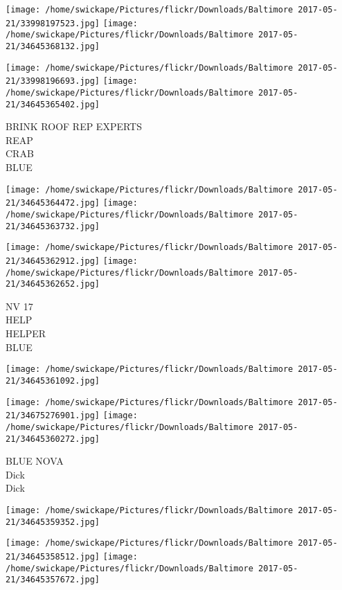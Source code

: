 \documentclass[10pt,letterpaper]{article}
\begin{document}
\texttt{[image: /home/swickape/Pictures/flickr/Downloads/Baltimore 2017-05-21/33998197523.jpg]}
\texttt{[image: /home/swickape/Pictures/flickr/Downloads/Baltimore 2017-05-21/34645368132.jpg]}

\texttt{[image: /home/swickape/Pictures/flickr/Downloads/Baltimore 2017-05-21/33998196693.jpg]}
\texttt{[image: /home/swickape/Pictures/flickr/Downloads/Baltimore 2017-05-21/34645365402.jpg]}

BRINK ROOF REP EXPERTS\\
REAP\\
CRAB\\
BLUE\\
\pagebreak

\texttt{[image: /home/swickape/Pictures/flickr/Downloads/Baltimore 2017-05-21/34645364472.jpg]}
\texttt{[image: /home/swickape/Pictures/flickr/Downloads/Baltimore 2017-05-21/34645363732.jpg]}

\texttt{[image: /home/swickape/Pictures/flickr/Downloads/Baltimore 2017-05-21/34645362912.jpg]}
\texttt{[image: /home/swickape/Pictures/flickr/Downloads/Baltimore 2017-05-21/34645362652.jpg]}

NV 17\\
HELP\\
HELPER\\
BLUE\\
\pagebreak

\texttt{[image: /home/swickape/Pictures/flickr/Downloads/Baltimore 2017-05-21/34645361092.jpg]}

\vspace{0.25in}
\texttt{[image: /home/swickape/Pictures/flickr/Downloads/Baltimore 2017-05-21/34675276901.jpg]}
\texttt{[image: /home/swickape/Pictures/flickr/Downloads/Baltimore 2017-05-21/34645360272.jpg]}

BLUE NOVA\\
Dick\\
Dick\\
\pagebreak

\texttt{[image: /home/swickape/Pictures/flickr/Downloads/Baltimore 2017-05-21/34645359352.jpg]}

\vspace{0.25in}
\texttt{[image: /home/swickape/Pictures/flickr/Downloads/Baltimore 2017-05-21/34645358512.jpg]}
\texttt{[image: /home/swickape/Pictures/flickr/Downloads/Baltimore 2017-05-21/34645357672.jpg]}
\end{document}
